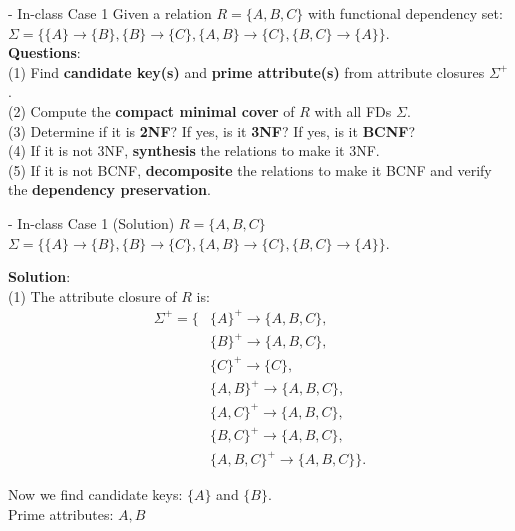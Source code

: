 \begin{frame}[fragile]{ - In-class Case 1}
	Given a relation $R=\{A, B, C\}$ with functional dependency set:\\ 
	$\Sigma=\{\{A\} \rightarrow \{B\},\{B\} \rightarrow \{C\}, \{A, B\} \rightarrow \{C\},\{B, C\} \rightarrow \{A\}\}.$\\\vspace{10pt}
	\textbf{Questions}:\\
	(1) Find \textbf{candidate key(s)} and \textbf{prime attribute(s)} from attribute closures $\Sigma^{+}$.\\
	(2) Compute the \textbf{compact minimal cover} of $R$ with all FDs $\Sigma$.\\
	(3) Determine if it is \textbf{2NF}? If yes, is it \textbf{3NF}? If yes, is it \textbf{BCNF}?\\
	(4) If it is not 3NF, \textbf{synthesis} the relations to make it 3NF.\\
	(5) If it is not BCNF, \textbf{decomposite} the relations to make it BCNF and verify the \textbf{dependency preservation}. 
\end{frame}

\begin{frame}[fragile]{ - In-class Case 1 (Solution)}
	$R=\{A, B, C\}$\\ 
	$\Sigma=\{\{A\} \rightarrow \{B\},\{B\} \rightarrow \{C\}, \{A, B\} \rightarrow \{C\},\{B, C\} \rightarrow \{A\}\}.$\\\vspace{5pt}
	
	\textbf{Solution}:\\
	(1) The attribute closure of $R$ is:
	\begin{align*} 
		\Sigma^{+} = \{&\{A\}^{+} \rightarrow \{A,B,C\},\\
		&\{B\}^{+} \rightarrow \{A,B,C\},\\
		&\{C\}^{+} \rightarrow \{C\},\\
		&\{A,B\}^{+} \rightarrow \{A,B,C\},\\
		&\{A,C\}^{+} \rightarrow \{A,B,C\},\\
		&\{B,C\}^{+} \rightarrow \{A,B,C\},\\
		&\{A,B,C\}^{+} \rightarrow \{A,B,C\}\}.
	\end{align*} 
	
	Now we find candidate keys: $\{A\}$ and $\{B\}$.\\
	Prime attributes: $A, B$
\end{frame}

